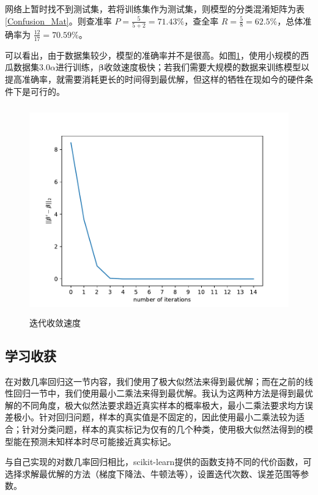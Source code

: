 \documentclass{ctexart}
\begin{document}
	网络上暂时找不到测试集，若将训练集作为测试集，则模型的分类混淆矩阵为表\ref{Confusion_Mat}。则查准率 $P=\frac{5}{5+2}=71.43\%$，查全率 $R=\frac{5}{8}=62.5\%$，总体准确率为 $\frac{12}{17}=70.59\%$。
	
	可以看出，由于数据集较少，模型的准确率并不是很高。如图\ref{迭代速度图}，使用小规模的西瓜数据集$3.0\alpha$进行训练，$\bm{\beta}$收敛速度极快；若我们需要大规模的数据来训练模型以提高准确率，就需要消耗更长的时间得到最优解，但这样的牺牲在现如今的硬件条件下是可行的。
	
	\begin{figure}[htb]
		\centering
		\includegraphics[scale=1,height=9cm]{../image/3.3迭代关系}
		\caption{迭代收敛速度}
		\label{迭代速度图}
	\end{figure}

	\subsection{学习收获}
	
	在对数几率回归这一节内容，我们使用了极大似然法来得到最优解；而在之前的线性回归一节中，我们使用最小二乘法来得到最优解。我认为这两种方法是得到最优解的不同角度，极大似然法要求趋近真实样本的概率极大，最小二乘法要求均方误差极小。针对回归问题，样本的真实值是不固定的，因此使用最小二乘法较为适合；针对分类问题，样本的真实标记为仅有的几个种类，使用极大似然法得到的模型能在预测未知样本时尽可能接近真实标记。
	
	与自己实现的对数几率回归相比，scikit-learn提供的函数支持不同的代价函数，可选择求解最优解的方法（梯度下降法、牛顿法等），设置迭代次数、误差范围等参数。
\end{document}

